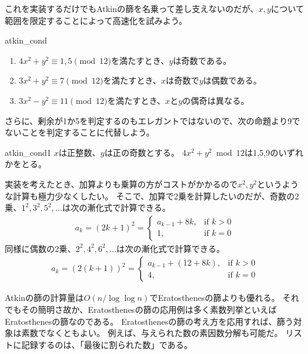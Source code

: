 これを実装するだけでもAtkinの篩を名乗って差し支えないのだが、$x,y$について範囲を限定することによって高速化を試みよう。

\begin{Prop}{}{atkin_cond}\;
\begin{enumerate}
 \item $4x^2+y^2 \equiv 1,5 \pmod{12}$を満たすとき、$y$は奇数である。
 \item $3x^2+y^2 \equiv 7 \pmod{12}$を満たすとき、$x$は奇数で$y$は偶数である。
 \item $3x^2-y^2 \equiv 11 \pmod{12}$を満たすとき、$x$と$y$の偶奇は異なる。
\end{enumerate}
\end{Prop}

さらに、剰余が1か5を判定するのもエレガントではないので、次の命題より9でないことを判定することに代替しよう。

\begin{Prop}{}{atkin_cond1}
$x$は正整数、$y$は正の奇数とする。
$4x^2+y^2 \bmod{12}$は1,5,9のいずれかをとる。
\end{Prop}

実装を考えたとき、加算よりも乗算の方がコストがかかるので$x^2,y^2$というような計算も極力少なくしたい。
そこで、加算で2乗を計算したいのだが、奇数の2乗、$1^2,3^2,5^2,\ldots$は次の漸化式で計算できる。
\begin{align*}
a_{k} = (2k+1)^2 =
\begin{cases}
a_{k-1} + 8k, &\mbox{if } k > 0\\
1, &\mbox{if } k = 0
\end{cases}
\end{align*}
同様に偶数の2乗、$2^2,4^2,6^2,\ldots$は次の漸化式で計算できる。
\begin{align*}
a_k = (2(k+1))^2 =
\begin{cases}
a_{k-1} + (12 + 8k), &\mbox{if } k > 0\\
4, &\mbox{if } k = 0
\end{cases}
\end{align*}


Atkinの篩の計算量は$O(n/\log{\log{n}})$でEratosthenesの篩よりも優れる。
それでもその簡明さ故か、Eratosthenesの篩の応用例は多く素数列挙といえばEratosthenesの篩なのである。
Eratosthenesの篩の考え方を応用すれば、篩う対象は素数でなくともよい。
例えば、与えられた数の素因数分解も可能だ。
リストに記録するのは、「最後に割られた数」である。


